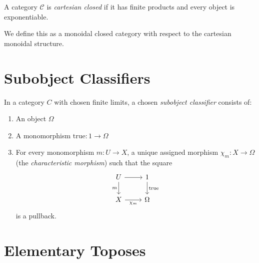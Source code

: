 \begin{definition}
  \label{def:monoidal-closed-category}
  \mathlibok
  
\end{definition}

\begin{definition} 
  \label{def:cartesian-closed-category}
  \mathlibok
  A category \(\mathcal{C}\) is \emph{cartesian closed} if it has finite products and every object is exponentiable.

  We define this as a monoidal closed category with respect to the cartesian monoidal structure.
\end{definition}

\section{Subobject Classifiers}

\begin{definition}
  \label{def:subobject-classifier}
  \notready

  In a category $C$ with chosen finite limits, a chosen \emph{subobject classifier} consists of:
  \begin{enumerate}
  \item An object $\Omega$
  \item A monomorphism $\text{true} : 1 \to \Omega$ 
  \item For every monomorphism $m : U \to X$, a unique assigned morphism $\chi_m : X \to \Omega$ (the \emph{characteristic morphism}) such that the square
    \[\begin{tikzcd}
        U \ar[r] \ar[d, "m"'] & 1 \ar[d, "\text{true}"] \\
        X \ar[r, "\chi_m"'] & \Omega
      \end{tikzcd}\]
    is a pullback.
  \end{enumerate}
\end{definition}

\section{Elementary Toposes}

